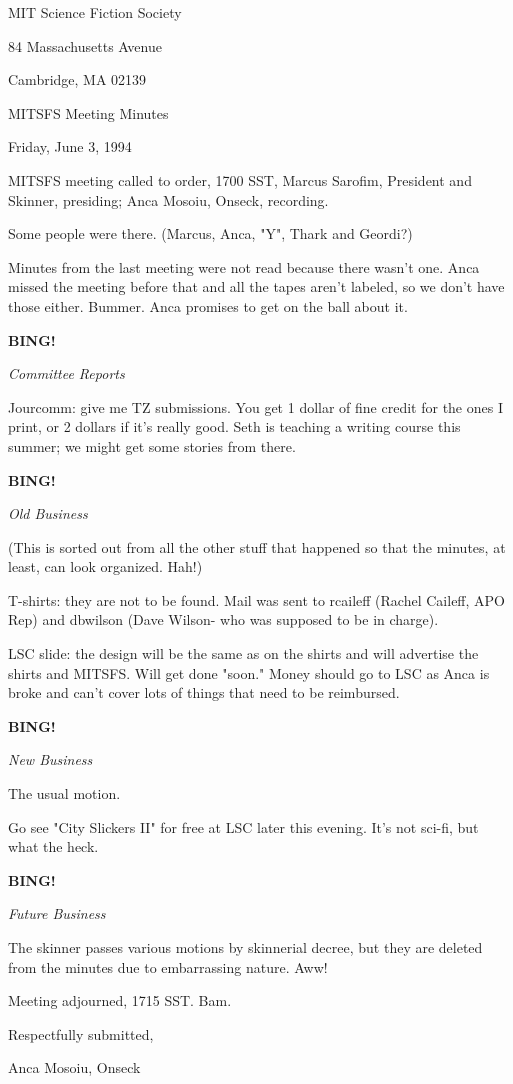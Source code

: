 \documentclass[12pt]{article}
\newcommand{\bing}{{\bf BING!} }
\newcommand{\goto}[1]{\bing \vskip 12pt \centerline{{\em{#1}}}}
\begin{document}
\begin{center}

MIT Science Fiction Society 

84 Massachusetts Avenue

Cambridge, MA 02139

\vspace{12pt}

MITSFS Meeting Minutes 

Friday, June 3, 1994

\end{center}
 
\vspace{18pt}

\setlength{\parskip}{6pt}

\noindent
MITSFS meeting called to order, 1700 SST,
Marcus Sarofim, President and Skinner, presiding; Anca Mosoiu, Onseck, recording.

Some people were there. (Marcus, Anca, "Y", Thark and Geordi?)

Minutes from the last meeting were not read because there wasn't one. Anca missed the meeting before that and all the tapes aren't labeled, so we don't have those either. Bummer. Anca promises to get on the ball about it.

\goto{Committee Reports}

Jourcomm: give me TZ submissions. You get 1 dollar of fine credit for the ones I print, or 2 dollars if it's really good. Seth is teaching a writing course this summer; we might get some stories from there.

\goto{Old Business}

(This is sorted out from all the other stuff that happened so that the minutes, at least, can look organized. Hah!)

T-shirts: they are not to be found. Mail was sent to rcaileff (Rachel Caileff, APO Rep) and dbwilson (Dave Wilson- who was supposed to be in charge).

LSC slide: the design will be the same as on the shirts and will advertise the shirts and MITSFS. Will get done "soon." Money should go to LSC as Anca is broke and can't cover lots of things that need to be reimbursed.

\goto{New Business}

The usual motion.

Go see "City Slickers II" for free at LSC later this evening. It's not sci-fi, but what the heck.

\goto{Future Business}

The skinner passes various motions by skinnerial decree, but they are deleted from the minutes due to embarrassing nature. Aww!

\vspace{12pt}

\noindent
Meeting adjourned, 1715 SST. Bam.

\vspace{18pt}

\centerline{Respectfully submitted,}
\centerline{Anca Mosoiu, Onseck}
\end{document}
